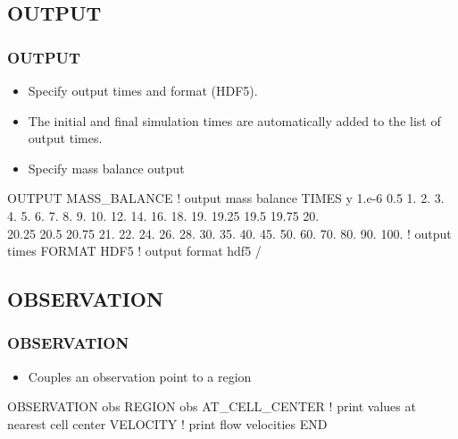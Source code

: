 \documentclass{beamer}
\newcommand\bluecomment[1]{{{\color{blue} #1}}}
\begin{document}
\subsection{OUTPUT}

\begin{frame}[fragile]\frametitle{OUTPUT}

\begin{itemize}
\item Specify output times and format (HDF5).
\item The initial and final simulation times are automatically added to the list of output times.
\item Specify mass balance output
\end{itemize}


\begin{semiverbatim}
OUTPUT
  MASS_BALANCE             \bluecomment{! output mass balance}
  TIMES y 1.e-6 0.5 1. 2. 3. 4. 5. 6. 7. 8. 9. 10. 12.
  14. 16. 18. 19. 19.25 19.5 19.75 20. \\
  20.25 20.5 20.75 21. 22. 24. 26. 28. 30. 35. 40. 45. 
  50. 60. 70. 80. 90. 100. \bluecomment{! output times}
  FORMAT HDF5              \bluecomment{! output format hdf5}
/
\end{semiverbatim}

\end{frame}

\subsection{OBSERVATION}

\begin{frame}[fragile]\frametitle{OBSERVATION}

\begin{itemize}
\item Couples an observation point to a region
\end{itemize}

\begin{semiverbatim}

OBSERVATION obs
  REGION obs
  AT_CELL_CENTER    \bluecomment{! print values at nearest cell center}
  VELOCITY          \bluecomment{! print flow velocities}
END

\end{semiverbatim}

\end{frame}
\end{document}
